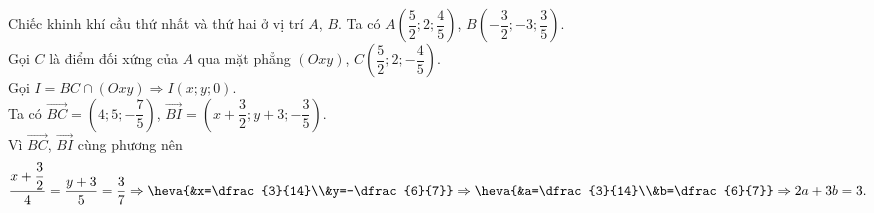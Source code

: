 \begin{bt}
{		Chiếc khinh khí cầu thứ nhất và thứ hai ở vị trí $A$, $B$. Ta có $A\left(\dfrac{5}{2};2;\dfrac{4}{5}\right)$, $B\left(-\dfrac{3}{2};-3;\dfrac{3}{5}\right)$.\\
		Gọi $C$ là điểm đối xứng của $A$ qua mặt phẳng $(Oxy)$, $C\left(\dfrac{5}{2};2;-\dfrac{4}{5}\right)$.\\ Gọi $I=BC\cap (Oxy)\Rightarrow I(x;y;0)$.\\ 
		Ta có
		$\overrightarrow{BC}=\left(4;5;-\dfrac{7}{5}\right)$, $\overrightarrow{BI}=\left(x+\dfrac{3}{2};y+3;-\dfrac{3}{5}\right)$.\\
		Vì $\overrightarrow{BC}$, $\overrightarrow{BI}$ cùng phương nên 
		$$\dfrac{x+\dfrac{3}{2}}{4}=\dfrac{y+3}{5}=\dfrac{3}{7}
		\Rightarrow\heva{&x=\dfrac{3}{14}\\&y=-\dfrac{6}{7}}
		\Rightarrow\heva{&a=\dfrac{3}{14}\\&b=\dfrac{6}{7}}
		\Rightarrow 2a+3b=3.$$
	}
\end{bt}

